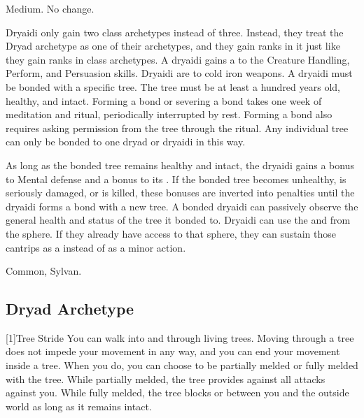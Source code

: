    Medium.
   No change.
  \begin{raggeditemize}
     Dryaidi only gain two class archetypes instead of three.
      Instead, they treat the Dryad archetype as one of their archetypes, and they gain ranks in it just like they gain ranks in class archetypes.
     A dryaidi gains a   to the Creature Handling, Perform, and Persuasion skills.
     Dryaidi are \vulnerable to cold iron weapons.
     A dryaidi must be bonded with a specific tree.
      The tree must be at least a hundred years old, healthy, and intact.
      Forming a bond or severing a bond takes one week of meditation and ritual, periodically interrupted by rest.
      Forming a bond also requires asking permission from the tree through the ritual.
      Any individual tree can only be bonded to one dryad or dryaidi in this way.

      As long as the bonded tree remains healthy and intact, the dryaidi gains a  bonus to Mental defense and a  bonus to its .
      If the bonded tree becomes unhealthy, is seriously damaged, or is killed, these bonuses are inverted into penalties until the dryaidi forms a bond with a new tree.
      A bonded dryaidi can passively observe the general health and status of the tree it bonded to.
     Dryaidi can use the  and   from the  sphere.
      If they already have access to that sphere, they can sustain those cantrips as a  instead of as a minor action.
  \end{raggeditemize}
   Common, Sylvan.

  \subsection{Dryad Archetype}

    [1]{Tree Stride} You can walk into and through living trees.
      Moving through a tree does not impede your movement in any way, and you can end your movement inside a tree.
      When you do, you can choose to be partially melded or fully melded with the tree.
      While partially melded, the tree provides  against all attacks against you.
      While fully melded, the tree blocks  or  between you and the outside world as long as it remains intact.

